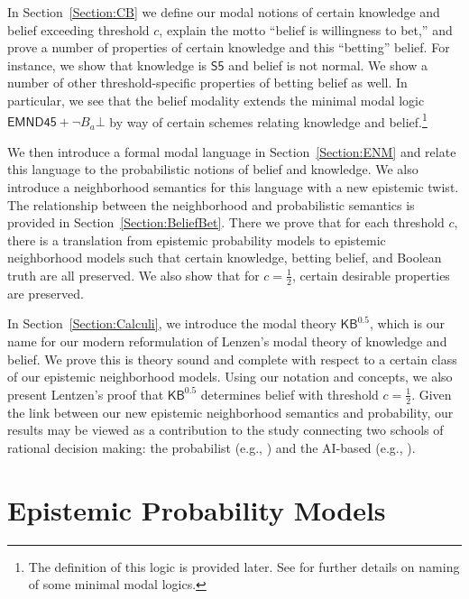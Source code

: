 \documentclass[12pt]{article}
\theoremstyle{definition}
\newcommand{\KBeq}{{\mathsf{KB}^{\mathsf{0.5}}}}       %
\begin{document}
In Section~\ref{Section:CB} we define our modal notions of certain
knowledge and belief exceeding threshold $c$, explain the motto
``belief is willingness to bet,'' and prove a number of properties of
certain knowledge and this ``betting'' belief.  For instance, we show
that knowledge is $\mathsf{S5}$ and belief is not normal.  We show a
number of other threshold-specific properties of betting belief as
well.  In particular, we see that the belief modality extends the
minimal modal logic $\mathsf{EMND45}+\lnot B_a\bot$ by way of certain
schemes relating knowledge and belief.\footnote{The definition of this
  logic is provided later. See \cite[Ch.~8]{Chellas:ml} for further
  details on naming of some minimal modal logics.}

We then introduce a formal modal language in Section~\ref{Section:ENM}
and relate this language to the probabilistic notions of belief and
knowledge.  We also introduce a neighborhood semantics for this
language with a new epistemic twist.  The relationship between the
neighborhood and probabilistic semantics is provided in
Section~\ref{Section:BeliefBet}.  There we prove that for each
threshold $c$, there is a translation from epistemic probability
models to epistemic neighborhood models such that certain knowledge,
betting belief, and Boolean truth are all preserved.  We also show
that for $c=\frac 12$, certain desirable properties are preserved.

In Section~\ref{Section:Calculi}, we introduce the modal theory
$\KBeq$, which is our name for our modern reformulation of Lenzen's
modal theory of knowledge and belief.  We prove this is theory sound
and complete with respect to a certain class of our epistemic
neighborhood models.  Using our notation and concepts, we also present
Lentzen's proof \cite{Lenzen1980:gwuw} that $\KBeq$ determines belief
with threshold $c=\frac 12$.  Given the link between our new epistemic
neighborhood semantics and probability, our results may be viewed as a
contribution to the study connecting two schools of rational decision
making: the probabilist (e.g., \cite{koerner2008naive}) and the
AI-based (e.g., \cite{KyburgTeng2012:tlorkr}).


\section{Epistemic Probability Models}
\label{Section:EPL} 
\end{document}
